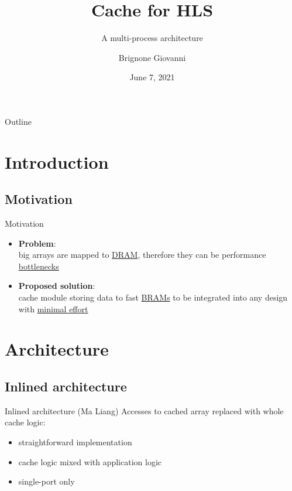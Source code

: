 \documentclass{beamer}
\title{Cache for HLS}
\subtitle{A multi-process architecture}
\author{Brignone Giovanni}
\institute{Politecnico di Torino}
\date{June 7, 2021}
\begin{document}
\begin{frame}
	\maketitle
\end{frame}

\begin{frame}{Outline}
	\tableofcontents
\end{frame}

\section{Introduction}
\subsection{Motivation}
\begin{frame}{Motivation}
	\begin{itemize}
		\item \textbf{Problem}:\\
			big arrays are mapped to \underline{DRAM}, therefore they can be
			performance \underline{bottlenecks}
		\item \textbf{Proposed solution}:\\
			cache module storing data to fast \underline{BRAMs} to
			be integrated into any design with \underline{minimal effort}
	\end{itemize}
\end{frame}

\section{Architecture}
\subsection{Inlined architecture}
\begin{frame}{Inlined architecture (Ma Liang)}
	Accesses to cached array replaced with whole cache logic:
	\begin{itemize}
		\item straightforward implementation
		\item cache logic mixed with application logic
		\item single-port only
	\end{itemize}
\end{frame}
\end{document}
